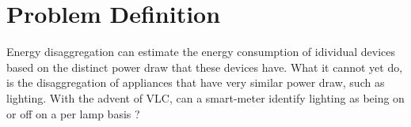 

\section{Problem Definition}

Energy disaggregation can estimate the energy consumption of idividual devices based on the distinct power draw that these devices have.
What it cannot yet do, is the disaggregation of appliances that have very similar power draw, such as lighting.
With the advent of VLC, can a smart-meter identify lighting as being on or off on a per lamp basis ?
